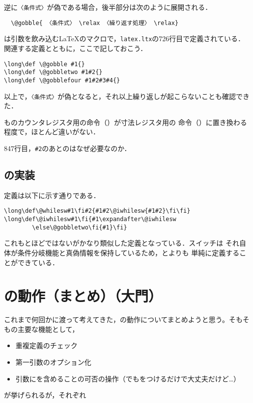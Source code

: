 \documentclass[autodetect-engine,dvipdfmx]{jsarticle}
\begin{document}
逆に\texttt{〈条件式〉}が偽である場合，後半部分は次のように展開される．
%
\begin{lstlisting}
  \@gobble{ 〈条件式〉 \relax 〈繰り返す処理〉 \relax}
\end{lstlisting}
%
は引数を飲み込む\LaTeX のマクロで，\texttt{latex.ltx}の726行目で定義されている．
関連する定義とともに，ここで記しておこう．
%
\latexltx
\begin{lstlisting}[firstnumber=726]
\long\def \@gobble #1{}
\long\def \@gobbletwo #1#2{}
\long\def \@gobblefour #1#2#3#4{}
\end{lstlisting}
%
以上で，\texttt{〈条件式〉}が偽となると，それ以上繰り返しが起こらないことも確認できた．

ものカウンタレジスタ用の命令（）が寸法レジスタ用の
命令（）に置き換わる程度で，ほとんど違いがない．

\begin{question}
847行目，\verb|#2|のあとのはなぜ必要なのか．
\end{question}

\subsection{の実装}

定義は以下に示す通りである．
%
\begin{lstlisting}[firstnumber=853]
\long\def\@whilesw#1\fi#2{#1#2\@iwhilesw{#1#2}\fi\fi}
\long\def\@iwhilesw#1\fi{#1\expandafter\@iwhilesw
        \else\@gobbletwo\fi{#1}\fi}
\end{lstlisting}
%
これもとほどではないがかなり類似した定義となっている．スイッチは
それ自体が条件分岐機能と真偽情報を保持しているため，とよりも
単純に定義することができている．

\section{の動作（まとめ）（大門）}
これまで何回かに渡って考えてきた，の動作についてまとめようと思う。そもそもの主要な機能として，

\begin{itemize}
\item 重複定義のチェック
\item 第一引数のオプション化
\item 引数にを含めることの可否の操作（でもをつけるだけで大丈夫だけど…）
\end{itemize}
が挙げられるが，それぞれ
\end{document}
